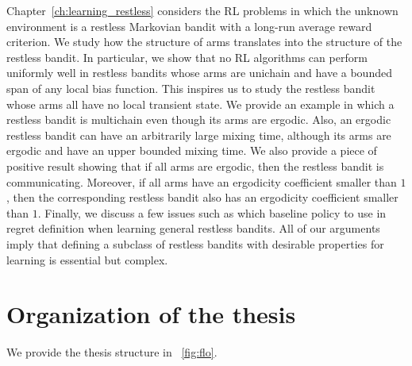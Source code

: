 Chapter~\ref{ch:learning_restless} considers the RL problems in which the unknown environment is a restless Markovian bandit with a long-run average reward criterion.
We study how the structure of arms translates into the structure of the restless bandit.
In particular, we show that no RL algorithms can perform uniformly well in restless bandits whose arms are unichain and have a bounded span of any local bias function.
This inspires us to study the restless bandit whose arms all have no local transient state.
We provide an example in which a restless bandit is multichain even though its arms are ergodic.
Also, an ergodic restless bandit can have an arbitrarily large mixing time, although its arms are ergodic and have an upper bounded mixing time.
We also provide a piece of positive result showing that if all arms are ergodic, then the restless bandit is communicating.
Moreover, if all arms have an ergodicity coefficient smaller than $1$, then the corresponding restless bandit also has an ergodicity coefficient smaller than $1$.
Finally, we discuss a few issues such as which baseline policy to use in regret definition when learning general restless bandits.
All of our arguments imply that defining a subclass of restless bandits with desirable properties for learning is essential but complex.

\section{Organization of the thesis}

We provide the thesis structure in \figurename~\ref{fig:flo}.


